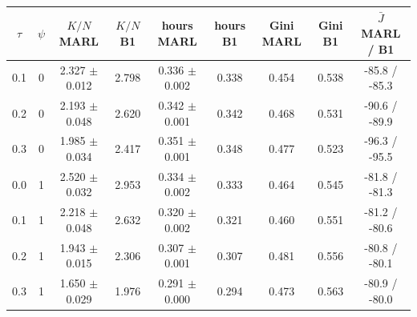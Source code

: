 \begin{tabular}{ccccccccc}
\toprule
$\tau$ & $\psi$ & $K/N$ MARL & $K/N$ B1 & hours MARL & hours B1 & Gini MARL & Gini B1 & $\bar J$ MARL / B1\\
\midrule
0.1 & 0 & 2.327 $\pm$ 0.012 & 2.798 & 0.336 $\pm$ 0.002 & 0.338 & 0.454 & 0.538 & -85.8 / -85.3\\
0.2 & 0 & 2.193 $\pm$ 0.048 & 2.620 & 0.342 $\pm$ 0.001 & 0.342 & 0.468 & 0.531 & -90.6 / -89.9\\
0.3 & 0 & 1.985 $\pm$ 0.034 & 2.417 & 0.351 $\pm$ 0.001 & 0.348 & 0.477 & 0.523 & -96.3 / -95.5\\
0.0 & 1 & 2.520 $\pm$ 0.032 & 2.953 & 0.334 $\pm$ 0.002 & 0.333 & 0.464 & 0.545 & -81.8 / -81.3\\
0.1 & 1 & 2.218 $\pm$ 0.048 & 2.632 & 0.320 $\pm$ 0.002 & 0.321 & 0.460 & 0.551 & -81.2 / -80.6\\
0.2 & 1 & 1.943 $\pm$ 0.015 & 2.306 & 0.307 $\pm$ 0.001 & 0.307 & 0.481 & 0.556 & -80.8 / -80.1\\
0.3 & 1 & 1.650 $\pm$ 0.029 & 1.976 & 0.291 $\pm$ 0.000 & 0.294 & 0.473 & 0.563 & -80.9 / -80.0\\
\bottomrule
\end{tabular}

